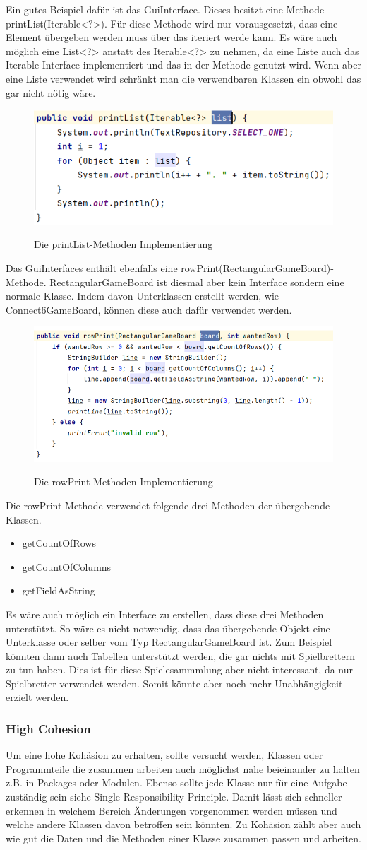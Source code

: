 \documentclass[12pt]{article}
\newcommand{\PrintList}{\includegraphics[width=15cm]{Bilder/printList}}
\newcommand{\RowPrint}{\includegraphics[width=15cm]{Bilder/rowPrint}}
\begin{document}
Ein gutes Beispiel dafür ist das GuiInterface. Dieses besitzt eine Methode printList(Iterable<?>). Für diese Methode wird nur vorausgesetzt, dass eine Element übergeben werden muss über das iteriert werde kann. Es wäre auch möglich eine List<?> anstatt des Iterable<?> zu nehmen, da eine Liste auch das Iterable Interface implementiert und das in der Methode genutzt wird. Wenn aber eine Liste verwendet wird schränkt man die verwendbaren Klassen ein obwohl das gar nicht nötig wäre.
\\

\begin{figure}[H]
\centering
{\PrintList}
\caption{Die printList-Methoden Implementierung}
\label{fig:printList}
\end{figure}


Das GuiInterfaces enthält ebenfalls eine rowPrint(RectangularGameBoard)-Methode. RectangularGameBoard ist diesmal aber kein Interface sondern eine normale Klasse. Indem davon Unterklassen erstellt werden, wie Connect6GameBoard, können diese auch dafür verwendet werden. 
\\

\begin{figure}[H]
\centering
{\RowPrint}
\caption{Die rowPrint-Methoden Implementierung}
\label{fig:rowPrint}
\end{figure}

Die rowPrint Methode verwendet folgende drei Methoden der übergebende Klassen.
\begin{itemize}
\item getCountOfRows
\item getCountOfColumns
\item getFieldAsString
\end{itemize}

Es wäre auch möglich ein Interface zu erstellen, dass diese drei Methoden unterstützt. So wäre es nicht notwendig, dass das übergebende Objekt eine Unterklasse oder selber vom Typ RectangularGameBoard ist. Zum Beispiel könnten dann auch Tabellen unterstützt werden, die gar nichts mit Spielbrettern zu tun haben. Dies ist für diese Spielesammmlung aber nicht interessant, da nur Spielbretter verwendet werden. Somit könnte aber noch mehr Unabhängigkeit erzielt werden.



\newpage
\subsubsection{High Cohesion}
Um eine hohe Kohäsion zu erhalten, sollte versucht werden, Klassen oder Programmteile die zusammen arbeiten auch möglichst nahe beieinander zu halten z.B. in Packages oder Modulen. Ebenso sollte jede Klasse nur für eine Aufgabe zuständig sein siehe Single-Responsibility-Principle. Damit lässt sich schneller erkennen in welchem Bereich Änderungen vorgenommen werden müssen und welche andere Klassen davon betroffen sein könnten. Zu Kohäsion zählt aber auch wie gut die Daten und die Methoden einer Klasse zusammen passen und arbeiten.
\end{document}
